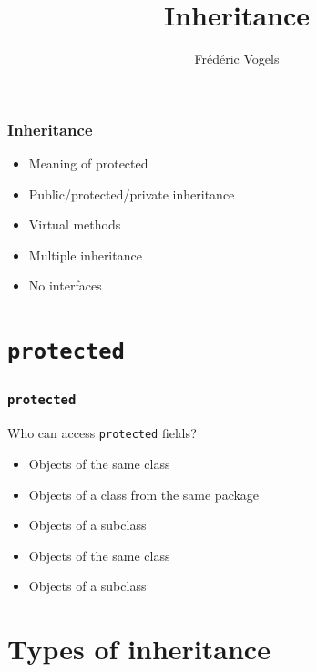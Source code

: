 \usepackage{ucll-code}

\usetikzlibrary{arrows.meta}

\title{Inheritance}
\author{Fr\'ed\'eric Vogels}

\lstset{language=c++14}




\begin{frame}
  \titlepage
\end{frame}

\begin{frame}
  \frametitle{Inheritance}
  \begin{itemize}
    \item Meaning of protected
    \item Public/protected/private inheritance
    \item Virtual methods
    \item Multiple inheritance
    \item No interfaces
  \end{itemize}
\end{frame}

\section{{\tt protected}}

\begin{frame}
  \tableofcontents[currentsection]
\end{frame}

\begin{frame}
  \frametitle{{\tt protected}}
  \begin{center}
    Who can access \texttt{protected} fields?
  \end{center}
  \begin{itemize}
    \item Objects of the same class
    \item Objects of a class from the same package
    \item Objects of a subclass
  \end{itemize}
  \vskip5mm
  \begin{itemize}
    \item Objects of the same class
    \item Objects of a subclass
  \end{itemize}
\end{frame}


\section{Types of inheritance}

